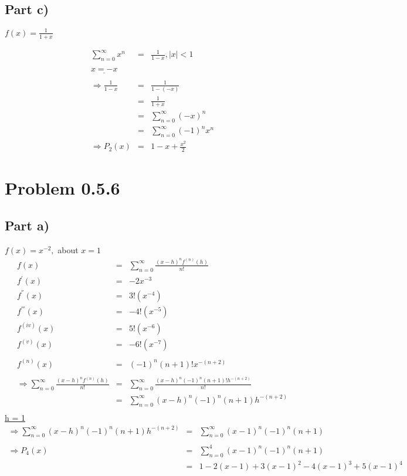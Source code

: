 \documentclass[12pt]{article}
\begin{document}
\subsection*{Part c)}
\(f(x) = \frac{1}{1+x}\)

\begin{eqnarray*}
\sum_{n=0}^{\infty} x^{n} & = & \frac{1}{1-x}, \left|x\right| < 1\\
\\
\underline{x = -x}\\
\\
\Rightarrow\frac{1}{1-x} & = & \frac{1}{1 - (-x)}\\
& = & \frac{1}{1 + x}\\
& = & \sum_{n=0}^{\infty} (-x)^{n}\\
& = & \sum_{n=0}^{\infty} (-1)^{n}x^{n}\\
\Rightarrow P_{2}(x) & = & 1 - x + \frac{x^{2}}{2}
\end{eqnarray*}
\section*{Problem 0.5.6}
\subsection*{Part a)}
\(f(x) = x^{-2},\) about \(x=1\)\\
\begin{eqnarray*}
f(x) & = & \sum_{n=0}^{\infty} \frac{(x-h)^{n}f^{(n)}(h)}{n!}\\
f^{'}(x) & = & -2x^{-3}\\
f^{''}(x) & = & 3!(x^{-4})\\
f^{'''}(x) & = & -4!(x^{-5})\\
f^{(iv)}(x) & = & 5!(x^{-6})\\
f^{(v)}(x) & = & -6!(x^{-7})\\
\\
f^{(n)}(x) & = & (-1)^{n}(n+1)!x^{-(n+2)}\\
\\
\Rightarrow\sum_{n=0}^{\infty} \frac{(x-h)^{n}f^{(n)}(h)}{n!} & = & \sum_{n=0}^{\infty} \frac{(x-h)^{n}(-1)^{n}(n+1)!h^{-(n+2)}}{n!}\\
& = & \sum_{n=0}^{\infty} (x-h)^{n}(-1)^{n}(n+1)h^{-(n+2)}\\
\end{eqnarray*}
\underline{h = 1}\\
\begin{eqnarray*}
\Rightarrow\sum_{n=0}^{\infty} (x-h)^{n}(-1)^{n}(n+1)h^{-(n+2)} & = & \sum_{n=0}^{\infty} (x-1)^{n}(-1)^{n}(n+1)\\
\\
\Rightarrow P_{4}(x) & = &\sum_{n=0}^{4} (x-1)^{n}(-1)^{n}(n+1)\\
& = & 1 - 2(x-1) + 3(x-1)^{2} - 4(x-1)^{3} + 5(x-1)^{4}\\
\end{eqnarray*}
\end{document}
